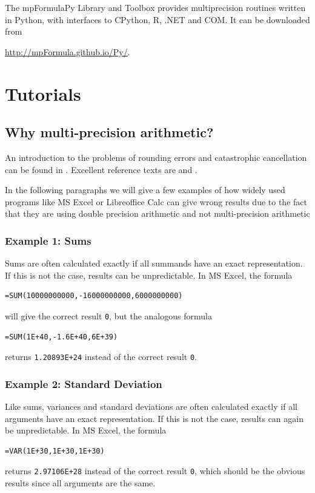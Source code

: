 The mpFormulaPy Library and Toolbox provides multiprecision routines written in Python, with interfaces to CPython, R, .NET and COM. It can be downloaded from 

\href{http://mpFormula.github.io/Py/}{http://mpFormula.github.io/Py/}. 





\chapter{Tutorials}
\label{Tutorials} 

\section{Why multi-precision arithmetic?}
\label{Why multiprecision arithmetic}

An introduction to the problems of rounding errors and catastrophic cancellation can be found in \cite{Goldberg91whatevery}. Excellent reference texts are  \cite{Higham2002} and \cite{Higham2009}.

In the following paragraphs we will give a few examples of how widely used programs like MS Excel or Libreoffice Calc can give wrong results due to the fact that they are using double precision arithmetic and not multi-precision arithmetic

\subsection{Example 1: Sums}

Sums are often calculated exactly if all summands have an exact representation. If this is not the case, results can be unpredictable. In MS Excel, the formula

\begin{verbatim}
=SUM(10000000000,-16000000000,6000000000)
\end{verbatim}
 will give the correct result  \verb|0|, but the analogous formula
 \begin{verbatim}
=SUM(1E+40,-1.6E+40,6E+39)
 \end{verbatim}
returns \verb|1.20893E+24| instead of the correct result \verb|0|.

\subsection{Example 2: Standard Deviation}
Like sums, variances and standard deviations are often calculated exactly if all arguments have an exact representation. If this is not the case, results can again be unpredictable. In MS Excel, the formula
 \begin{verbatim}
=VAR(1E+30,1E+30,1E+30)
 \end{verbatim}
returns \verb|2.97106E+28| instead of the correct result \verb|0|, which should be the obvious results since all arguments are the same.


